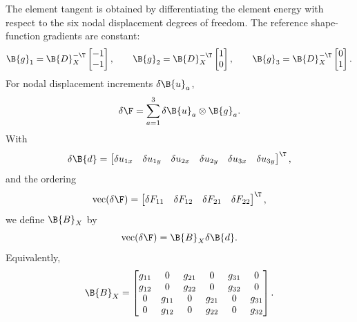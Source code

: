 The element tangent is obtained by differentiating the element energy with
respect to the six nodal displacement degrees of freedom. The reference
shape-function gradients are constant:
\begin{equation}
    \B{g}_1 = \B{D}_X^{-\T}
    \begin{bmatrix}
        -1\\ -1
    \end{bmatrix},
    \qquad
    \B{g}_2 = \B{D}_X^{-\T}
    \begin{bmatrix}
        1\\ 0
    \end{bmatrix},
    \qquad
    \B{g}_3 = \B{D}_X^{-\T}
    \begin{bmatrix}
        0\\ 1
    \end{bmatrix}.
\end{equation}
For nodal displacement increments $\delta\B{u}_a$,
\begin{equation}
    \delta\F
    =
    \sum_{a=1}^{3}\delta\B{u}_a\otimes\B{g}_a .
\end{equation}
With
\begin{equation}
    \delta\B{d}
    =
    \begin{bmatrix}
        \delta u_{1x} &
        \delta u_{1y} &
        \delta u_{2x} &
        \delta u_{2y} &
        \delta u_{3x} &
        \delta u_{3y}
    \end{bmatrix}^{\T},
\end{equation}
and the ordering
\begin{equation}
    \mathrm{vec}(\delta\F)
    =
    \begin{bmatrix}
        \delta F_{11} &
        \delta F_{12} &
        \delta F_{21} &
        \delta F_{22}
    \end{bmatrix}^{\T},
\end{equation}
we define $\B{B}_X$ by
\begin{equation}
    \mathrm{vec}(\delta\F)=\B{B}_X\delta\B{d}.
\end{equation}
Equivalently,
\begin{equation}
    \B{B}_X
    =
    \begin{bmatrix}
        g_{11} & 0      & g_{21} & 0      & g_{31} & 0      \\
        g_{12} & 0      & g_{22} & 0      & g_{32} & 0      \\
        0      & g_{11} & 0      & g_{21} & 0      & g_{31} \\
        0      & g_{12} & 0      & g_{22} & 0      & g_{32}
    \end{bmatrix}.
\end{equation}
